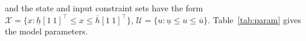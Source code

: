 \documentclass[a4paper, 10 pt, conference]{IEEEconf}
\def\U{\mathcal{U}}
\def\X{\mathcal{X}}
\begin{document}
and the state and input constraint sets have the form
$\X =\{ x : \underline{h} [1 \ 1 ]^\top \leq x \leq \overline{h} [1 \ 1 ]^\top\}$,
$\U =\{ u : \underline{u} \leq u \leq \overline{u} \}$.
%
Table~\ref{tab:param} gives the model parameters.

\end{document}
